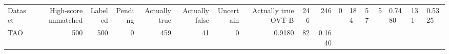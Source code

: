 \begin{tabular}{lrrrrrrrrr}
\toprule
Dataset & High-score unmatched & Labeled & Pending & Actually true & Actually false & Uncertain & Actually true %
\midrule
OVT-B & 246 & 246 & 0 & 184 & 57 & 5 & 0.7480 & 131 & 0.5325 \\
TAO & 500 & 500 & 0 & 459 & 41 & 0 & 0.9180 & 82 & 0.1640 \\
\bottomrule
\end{tabular}
